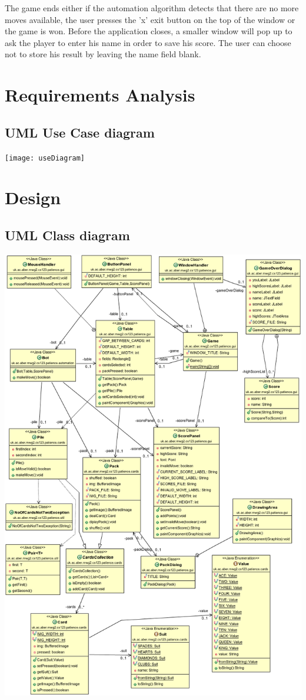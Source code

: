 \documentclass[a4paper, 11pt, titlepage]{article}
\begin{document}
The game ends either if the automation algorithm detects that there are no more moves 
available, the user presses the 'x' exit button on the top of the window or the game is won.
Before the application closes, a smaller window will pop up to ask the player to enter
his name in order to save his score. The user can choose not to store his result by leaving
the name field blank.

\newpage

\section{Requirements Analysis}
\subsection{UML Use Case diagram}
\texttt{[image: useDiagram]}

\section{Design}
\subsection{UML Class diagram}
\includegraphics[width=\textwidth]{classDiagram}
\end{document}
